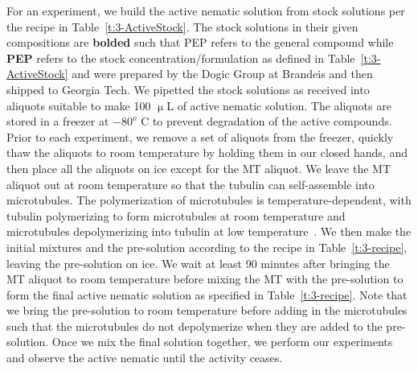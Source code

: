 For an experiment, we build the active nematic solution from stock solutions per the recipe in Table~\ref{t:3-ActiveStock}.
The stock solutions in their given compositions are {\bf bolded} such that PEP refers to the general compound while {\bf PEP} refers to the stock concentration/formulation as defined in Table~\ref{t:3-ActiveStock} and were prepared by the Dogic Group at Brandeis and then shipped to Georgia Tech.
We pipetted the stock solutions as received into aliquots suitable to make 100 $\upmu$L of active nematic solution.
The aliquots are stored in a freezer at $-80^o$ C to prevent degradation of the active compounds.
Prior to each experiment, we remove a set of aliquots from the freezer, quickly thaw the aliquots to room temperature by holding them in our closed hands, and then place all the aliquots on ice except for the MT aliquot.
We leave the MT aliquot out at room temperature so that the tubulin can self-assemble into microtubules.
The polymerization of microtubules is temperature-dependent, with tubulin polymerizing to form microtubules at room temperature and microtubules depolymerizing into tubulin at low temperature~\cite{RN3}.
We then make the initial mixtures and the pre-solution according to the recipe in Table~\ref{t:3-recipe}, leaving the pre-solution on ice.
We wait at least 90 minutes after bringing the MT aliquot to room temperature before mixing the MT with the pre-solution to form the final active nematic solution as specified in Table~\ref{t:3-recipe}.
Note that we bring the pre-solution to room temperature before adding in the microtubules such that the microtubules do not depolymerize when they are added to the pre-solution.
Once we mix the final solution together, we perform our experiments and observe the active nematic until the activity ceases.
